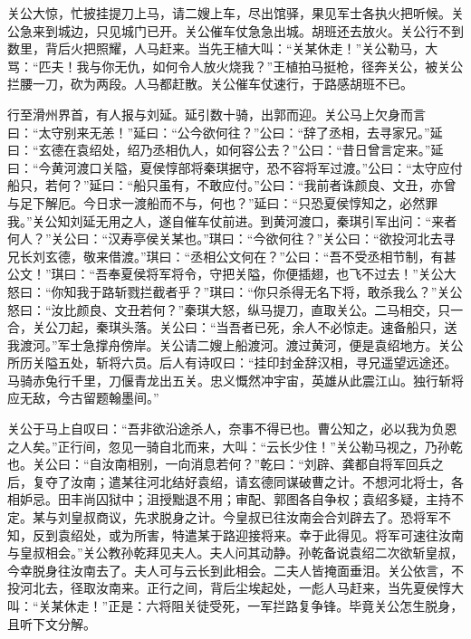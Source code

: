 关公大惊，忙披挂提刀上马，请二嫂上车，尽出馆驿，果见军士各执火把听候。关公急来到城边，只见城门已开。关公催车仗急急出城。胡班还去放火。关公行不到数里，背后火把照耀，人马赶来。当先王植大叫：“关某休走！”关公勒马，大骂：“匹夫！我与你无仇，如何令人放火烧我？”王植拍马挺枪，径奔关公，被关公拦腰一刀，砍为两段。人马都赶散。关公催车仗速行，于路感胡班不已。

行至滑州界首，有人报与刘延。延引数十骑，出郭而迎。关公马上欠身而言曰：“太守别来无恙！”延曰：“公今欲何往？”公曰：“辞了丞相，去寻家兄。”延曰：“玄德在袁绍处，绍乃丞相仇人，如何容公去？”公曰：“昔日曾言定来。”延曰：“今黄河渡口关隘，夏侯惇部将秦琪据守，恐不容将军过渡。”公曰：“太守应付船只，若何？”延曰：“船只虽有，不敢应付。”公曰：“我前者诛颜良、文丑，亦曾与足下解厄。今日求一渡船而不与，何也？”延曰：“只恐夏侯惇知之，必然罪我。”关公知刘延无用之人，遂自催车仗前进。到黄河渡口，秦琪引军出问：“来者何人？”关公曰：“汉寿亭侯关某也。”琪曰：“今欲何往？”关公曰：“欲投河北去寻兄长刘玄德，敬来借渡。”琪曰：“丞相公文何在？”公曰：“吾不受丞相节制，有甚公文！”琪曰：“吾奉夏侯将军将令，守把关隘，你便插翅，也飞不过去！”关公大怒曰：“你知我于路斩戮拦截者乎？”琪曰：“你只杀得无名下将，敢杀我么？”关公怒曰：“汝比颜良、文丑若何？”秦琪大怒，纵马提刀，直取关公。二马相交，只一合，关公刀起，秦琪头落。关公曰：“当吾者已死，余人不必惊走。速备船只，送我渡河。”军士急撑舟傍岸。关公请二嫂上船渡河。渡过黄河，便是袁绍地方。关公所历关隘五处，斩将六员。后人有诗叹曰：“挂印封金辞汉相，寻兄遥望远途还。马骑赤兔行千里，刀偃青龙出五关。忠义慨然冲宇宙，英雄从此震江山。独行斩将应无敌，今古留题翰墨间。”

关公于马上自叹曰：“吾非欲沿途杀人，奈事不得已也。曹公知之，必以我为负恩之人矣。”正行间，忽见一骑自北而来，大叫：“云长少住！”关公勒马视之，乃孙乾也。关公曰：“自汝南相别，一向消息若何？”乾曰：“刘辟、龚都自将军回兵之后，复夺了汝南；遣某往河北结好袁绍，请玄德同谋破曹之计。不想河北将士，各相妒忌。田丰尚囚狱中；沮授黜退不用；审配、郭图各自争权；袁绍多疑，主持不定。某与刘皇叔商议，先求脱身之计。今皇叔已往汝南会合刘辟去了。恐将军不知，反到袁绍处，或为所害，特遣某于路迎接将来。幸于此得见。将军可速往汝南与皇叔相会。”关公教孙乾拜见夫人。夫人问其动静。孙乾备说袁绍二次欲斩皇叔，今幸脱身往汝南去了。夫人可与云长到此相会。二夫人皆掩面垂泪。关公依言，不投河北去，径取汝南来。正行之间，背后尘埃起处，一彪人马赶来，当先夏侯惇大叫：“关某休走！”正是：六将阻关徒受死，一军拦路复争锋。毕竟关公怎生脱身，且听下文分解。